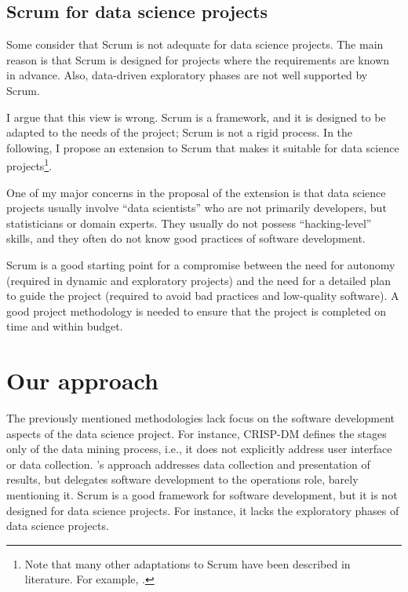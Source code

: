 \subsection{Scrum for data science projects}

Some consider that Scrum is not adequate for data science projects.  The main reason is
that Scrum is designed for projects where the requirements are known in advance.  Also,
data-driven exploratory phases are not well supported by Scrum.

I argue that this view is wrong.  Scrum is a framework, and it is designed to be adapted to
the needs of the project;  Scrum is not a rigid process.  In the following, I propose an
extension to Scrum that makes it suitable for data science projects\footnote{Note that
many other adaptations to Scrum have been described in literature.  For example,
.}.

One of my major concerns in the proposal of the extension is that data science projects
usually involve ``data scientists'' who are not primarily developers, but statisticians or
domain experts.  They usually do not possess ``hacking-level'' skills, and they often do not know
good practices of software development.

Scrum is a good starting point for a compromise between the need for autonomy (required in
dynamic and exploratory projects) and the need for a detailed plan to guide the project
(required to avoid bad practices and low-quality software). A good project methodology is
needed to ensure that the project is completed on time and within budget.

\section{Our approach}
\label{sec:our-approach}

The previously mentioned methodologies lack focus on the software development aspects of
the data science project.  For instance, CRISP-DM defines the stages only of the data
mining process, i.e., it does not explicitly address user interface or data collection.
\citeauthor{Zumel2019}'s approach addresses data collection and presentation of results, but
delegates software development to the operations role, barely mentioning it.  Scrum is
a good framework for software development, but it is not designed for data science
projects.  For instance, it lacks the exploratory phases of data science projects.

